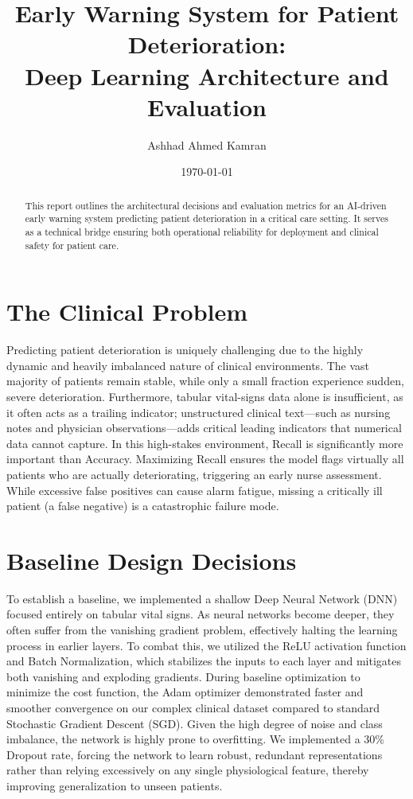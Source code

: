 \documentclass[11pt]{article}
\title{Early Warning System for Patient Deterioration: \\ Deep Learning Architecture and Evaluation}
\author{Ashhad Ahmed Kamran}
\date{\today}
\begin{document}
\maketitle

\begin{abstract}
This report outlines the architectural decisions and evaluation metrics for an AI-driven early warning system predicting patient deterioration in a critical care setting. It serves as a technical bridge ensuring both operational reliability for deployment and clinical safety for patient care.
\end{abstract}

\section{The Clinical Problem}

Predicting patient deterioration is uniquely challenging due to the highly dynamic and heavily imbalanced nature of clinical environments. The vast majority of patients remain stable, while only a small fraction experience sudden, severe deterioration. Furthermore, tabular vital-signs data alone is insufficient, as it often acts as a trailing indicator; unstructured clinical text—such as nursing notes and physician observations—adds critical leading indicators that numerical data cannot capture. In this high-stakes environment, Recall is significantly more important than Accuracy. Maximizing Recall ensures the model flags virtually all patients who are actually deteriorating, triggering an early nurse assessment. While excessive false positives can cause alarm fatigue, missing a critically ill patient (a false negative) is a catastrophic failure mode.



\section{Baseline Design Decisions}

To establish a baseline, we implemented a shallow Deep Neural Network (DNN) focused entirely on tabular vital signs. As neural networks become deeper, they often suffer from the vanishing gradient problem, effectively halting the learning process in earlier layers. To combat this, we utilized the ReLU activation function and Batch Normalization, which stabilizes the inputs to each layer and mitigates both vanishing and exploding gradients. During baseline optimization to minimize the cost function, the Adam optimizer demonstrated faster and smoother convergence on our complex clinical dataset compared to standard Stochastic Gradient Descent (SGD). Given the high degree of noise and class imbalance, the network is highly prone to overfitting. We implemented a 30\% Dropout rate, forcing the network to learn robust, redundant representations rather than relying excessively on any single physiological feature, thereby improving generalization to unseen patients.
\end{document}
